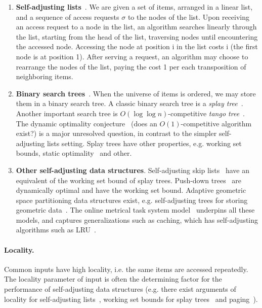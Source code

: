 \begin{enumerate}
  \item \textbf{Self-adjusting lists}~\cite{SleatorT85}. We are given a set of items, arranged in a linear list, and a sequence of access requests $\sigma$ to the nodes of the list.
Upon receiving an access request to a node in
the list, an algorithm searches linearly through the list, starting
from the head of the list, traversing nodes until encountering the
accessed node. Accessing the node at position i in the list costs i
(the first node is at position 1).
After serving a request, an algorithm may
choose to rearrange the nodes of the list, paying the cost 1 per each transposition of neighboring items. 


\item \textbf{Binary search trees}~\cite{SleatorT85Splay}.
When the universe of items is ordered, we may store them in a binary search tree.
A classic binary search tree is a \emph{splay tree}~\cite{SleatorT85Splay}.
Another important search tree is $O(\log \log n)$-competitive \emph{tango tree}~\cite{demaine2007dyynamic}.
The dynamic optimality conjecture~\cite{SleatorT85Splay} (does an $O(1)$-competitive algorithm exist?) is a major unresolved question, in contrast to the simpler self-adjusting lists setting.
Splay trees have other properties, e.g. working set bounds, static optimality~\cite{SleatorT85Splay} and other.



\item \textbf{Other self-adjusting data structures}. 
Self-adjusting skip lists~\cite{BoseDL08} have an equivalent of the working set bound of splay trees.
Push-down trees~\cite{Avin0020} are dynamically optimal and have the working set bound.
Adaptive geometric space partitioning data structures exist, e.g. self-adjusting trees for storing geometric data~\cite{ParkM12}.
The online metrical task system model~\cite{Borodin1992} underpins all these models, and captures generalizations such as caching, which has self-adjusting algorithms such as LRU~\cite{SleatorT85}.
\end{enumerate}



\paragraph*{Locality.}
Common inputs have high locality, i.e. the same items are accessed repeatedly.
The locality parameter of input is often the determining factor for the performance of self-adjusting data structures (e.g. there exist arguments of locality for self-adjusting lists~\cite{AlbersL16}, working set bounds for splay trees~\cite{SleatorT85Splay} and paging~\cite{AlbersFG05}).



